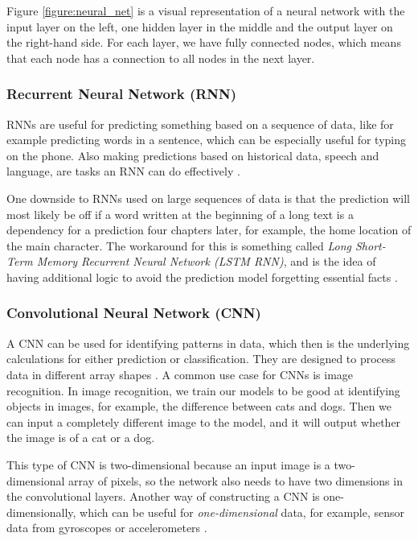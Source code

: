 Figure \ref{figure:neural_net} is a visual representation of a neural network with the input layer on the left, one hidden layer in the middle and the output layer on the right-hand side. For each layer, we have fully connected nodes, which means that each node has a connection to all nodes in the next layer.

\subsubsection{Recurrent Neural Network (RNN)}
RNNs are useful for predicting something based on a sequence of data, like for example predicting words in a sentence, which can be especially useful for typing on the phone. Also making predictions based on historical data, speech and language, are tasks an RNN can do effectively \cite{deep_learning}.

One downside to RNNs used on large sequences of data is that the prediction will most likely be off if a word written at the beginning of a long text is a dependency for a prediction four chapters later, for example, the home location of the main character. The workaround for this is something called \textit{Long Short-Term Memory Recurrent Neural Network (LSTM RNN)}, and is the idea of having additional logic to avoid the prediction model forgetting essential facts \cite{deep_learning}.

\subsubsection{Convolutional Neural Network (CNN)}
A CNN can be used for identifying patterns in data, which then is the underlying calculations for either prediction or classification. They are designed to process data in different array shapes \cite{deep_learning}. A common use case for CNNs is image recognition. In image recognition, we train our models to be good at identifying objects in images, for example, the difference between cats and dogs. Then we can input a completely different image to the model, and it will output whether the image is of a cat or a dog. 

This type of CNN is two-dimensional because an input image is a two-dimensional array of pixels, so the network also needs to have two dimensions in the convolutional layers. Another way of constructing a CNN is one-dimensionally, which can be useful for \textit{one-dimensional} data, for example, sensor data from gyroscopes or accelerometers \cite{deep_learning}.

